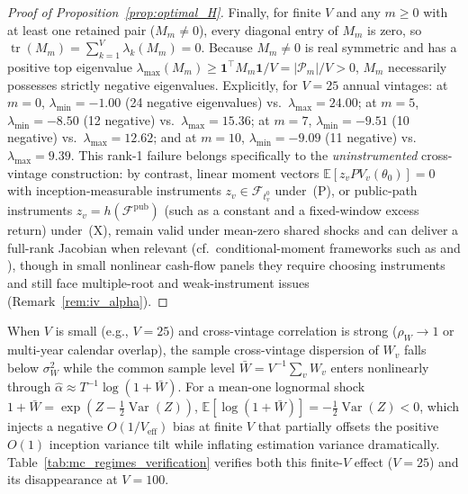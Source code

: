 \begin{proof}[Proof of Proposition~\ref{prop:optimal_H}]
Finally, for finite $V$ and any $m \ge 0$ with at least one retained pair ($M_m \neq 0$), every diagonal entry of $M_m$ is zero, so $\operatorname{tr}(M_m) = \sum_{k=1}^V \lambda_k(M_m) = 0$.
Because $M_m \neq 0$ is real symmetric and has a positive top eigenvalue $\lambda_{\max}(M_m) \ge \mathbf{1}^\top M_m \mathbf{1} / V = |\mathcal{P}_m|/V > 0$, $M_m$ necessarily possesses strictly negative eigenvalues.
Explicitly, for $V=25$ annual vintages: at $m=0$, $\lambda_{\min}=-1.00$ (24 negative eigenvalues) vs.\ $\lambda_{\max}=24.00$; at $m=5$, $\lambda_{\min}=-8.50$ (12 negative) vs.\ $\lambda_{\max}=15.36$; at $m=7$, $\lambda_{\min}=-9.51$ (10 negative) vs.\ $\lambda_{\max}=12.62$; and at $m=10$, $\lambda_{\min}=-9.09$ (11 negative) vs.\ $\lambda_{\max}=9.39$.
This rank-1 failure belongs specifically to the \emph{uninstrumented} cross-vintage construction: by contrast, linear moment vectors $\mathbb{E}[z_v PV_v(\theta_0)] = 0$ with inception-measurable instruments $z_v \in \mathcal{F}_{t_v^0}$ under~(P), or public-path instruments $z_v = h(\mathcal{F}^{\mathrm{pub}})$ (such as a constant and a fixed-window excess return) under~(X), remain valid under mean-zero shared shocks and can deliver a full-rank Jacobian when relevant (cf.\ conditional-moment frameworks such as \citealp{DL04} and \citealp{MJK20}), though in small nonlinear cash-flow panels they require choosing instruments and still face multiple-root and weak-instrument issues (Remark~\ref{rem:iv_alpha}).
\end{proof}

\begin{remark}
\label{rem:jensen_finite_V}
When $V$ is small (e.g., $V=25$) and cross-vintage correlation is strong ($\rho_W \to 1$ or multi-year calendar overlap), the sample cross-vintage dispersion of $W_v$ falls below $\sigma_W^2$ while the common sample level $\bar{W} = V^{-1}\sum_v W_v$ enters nonlinearly through $\hat\alpha \approx T^{-1}\log(1 + \bar{W})$. For a mean-one lognormal shock $1+\bar{W} = \exp(Z - \frac{1}{2}\operatorname{Var}(Z))$, $\mathbb{E}[\log(1+\bar{W})] = -\frac{1}{2}\operatorname{Var}(Z) < 0$, which injects a negative $O(1/V_{\mathrm{eff}})$ bias at finite $V$ that partially offsets the positive $O(1)$ inception variance tilt while inflating estimation variance dramatically. Table~\ref{tab:mc_regimes_verification} verifies both this finite-$V$ effect ($V=25$) and its disappearance at $V=100$.
\end{remark}

